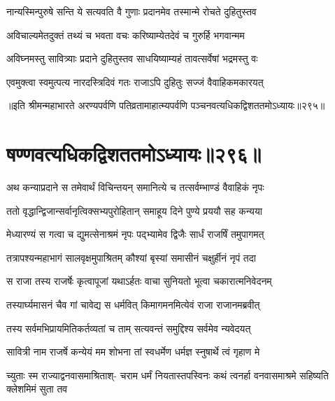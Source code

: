 \twolineshloka
{नान्यस्मिन्पुरुषे सन्ति ये सत्यवति वै गुणाः}
{प्रदानमेव तस्मान्मे रोचते दुहितुस्तव}




\twolineshloka
{अविचाल्यमेतदुक्तं तथ्यं च भवता वचः}
{करिष्याम्येतदेवं च गुरुर्हि भगवान्मम}




\twolineshloka
{अविघ्नमस्तु सावित्र्याः प्रदाने दुहितुस्तव}
{साधयिष्याम्यहं तावत्सर्वेषां भद्रमस्तु वः}




\twolineshloka
{एवमुक्त्वा स्वमुत्पत्य नारदस्त्रिदिवं गतः}
{राजाऽपि दुहितुः सज्जं वैवाहिकमकारयत्}


॥इति श्रीमन्महाभारते अरण्यपर्वणि पतिव्रतामाहात्म्यपर्वणि पञ्चनवत्यधिकद्विशततमोऽध्यायः॥२९५॥


\chapter{षण्णवत्यधिकद्विशततमोऽध्यायः॥२९६॥}


\twolineshloka
{अथ कन्याप्रदाने स तमेवार्थं विचिन्तयन्}
{समानित्ये च तत्सर्वम्भाण्डं वैवाहिकं नृपः}


\twolineshloka
{ततो वृद्धान्द्विजान्सर्वानृत्विक्सभ्यपुरोहितान्}
{समाहूय दिने पुण्ये प्रययौ सह कन्यया}


\twolineshloka
{मेध्यारण्यं स गत्वा च द्युमत्सेनाश्रमं नृपः}
{पद्भ्यामेव द्विजैः सार्धं राजर्षिं तमुपागमत्}


\twolineshloka
{तत्रापश्यन्महाभागं सालवृक्षमुपाश्रितम्}
{कौश्यां बृस्यां समासीनं चक्षुर्हीनं नृपं तदा}


\twolineshloka
{स राजा तस्य राजर्षेः कृत्वापूजां यथाऽर्हतः}
{वाचा सुनियतो भूत्वा चकारात्मनिवेदनम्}


\twolineshloka
{तस्यार्घ्यमासनं चैव गां चावेद्य स धर्मवित्}
{किमागमनमित्येवं राजा राजानमब्रवीत्}


\twolineshloka
{तस्य सर्वमभिप्रायमितिकर्तव्यतां च ताम्}
{सत्यवन्तं समुद्दिश्य सर्वमेव न्यवेदयत्}


\twolineshloka
{सावित्री नाम राजर्षे कन्येयं मम शोभना}
{तां स्वधर्मेण धर्मज्ञ स्नुषार्थे त्वं गृहाण मे}




\fourlineindentedshloka
{च्युताः स्म राज्याद्वनवासमाश्रिताश्-}
{चराम धर्मं नियतास्तपस्विनः}
{कथं त्वनर्हा वनवासमाश्रमे}
{सहिष्यति क्लेशमिमं सुता तव}

